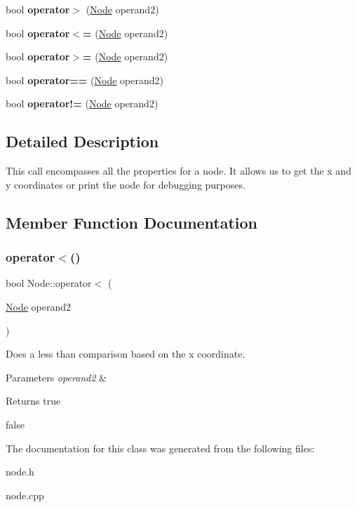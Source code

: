 \begin{DoxyCompactItemize}
bool {\bfseries operator$>$} (\hyperlink{classNode}{Node} operand2)
\item 
\mbox{\label{classNode_af2e6eb91242511cfdc0b3e971e236602}} 
bool {\bfseries operator$<$=} (\hyperlink{classNode}{Node} operand2)
\item 
\mbox{\label{classNode_a193b8c52f135714e5b7ca95e4516b1ff}} 
bool {\bfseries operator$>$=} (\hyperlink{classNode}{Node} operand2)
\item 
\mbox{\label{classNode_a7c1303e143bf8c170fbfa8e5fab9f88e}} 
bool {\bfseries operator==} (\hyperlink{classNode}{Node} operand2)
\item 
\mbox{\label{classNode_a6fb364f31ad72d22d3ac821e32233c26}} 
bool {\bfseries operator!=} (\hyperlink{classNode}{Node} operand2)
\end{DoxyCompactItemize}


\subsection{Detailed Description}
This call encompasses all the properties for a node. It allows us to get the x and y coordinates or print the node for debugging purposes. 

\subsection{Member Function Documentation}
\mbox{\label{classNode_ab0452101dad47b23bad5419963d85648}} 
\subsubsection{\texorpdfstring{operator$<$()}{operator<()}}
{\footnotesize\ttfamily bool Node\+::operator$<$ (\begin{DoxyParamCaption}\item[{\hyperlink{classNode}{Node}}]{operand2 }\end{DoxyParamCaption})}



Does a less than comparison based on the x coordinate. 


\begin{DoxyParams}{Parameters}
{\em operand2} & \\
\hline
\end{DoxyParams}
\begin{DoxyReturn}{Returns}
true 

false 
\end{DoxyReturn}


The documentation for this class was generated from the following files\+:\begin{DoxyCompactItemize}
\item 
node.\+h\item 
node.\+cpp\end{DoxyCompactItemize}
